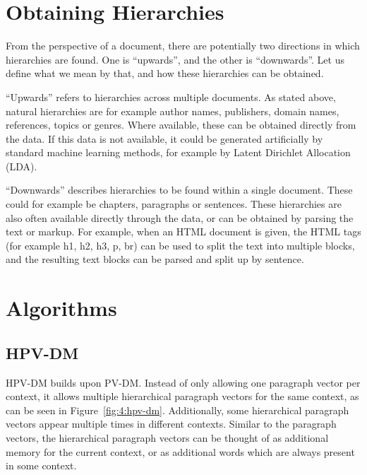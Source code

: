 \section{Obtaining Hierarchies}\label{obtaining-hierarchies}

From the perspective of a document, there are potentially two directions in which hierarchies are found. One is ``upwards'', and the other is ``downwards''. Let us define what we mean by that, and how these hierarchies can be obtained.

``Upwards'' refers to hierarchies across multiple documents. As stated above, natural hierarchies are for example author names, publishers, domain names, references, topics or genres. Where available, these can be obtained directly from the data. If this data is not available, it could be generated artificially by standard machine learning methods, for example by Latent Dirichlet Allocation (LDA).

``Downwards'' describes hierarchies to be found within a single document. These could for example be chapters, paragraphs or sentences. These hierarchies are also often available directly through the data, or can be obtained by parsing the text or markup. For example, when an HTML document is given, the HTML tags (for example h1, h2, h3, p, br) can be used to split the text into multiple blocks, and the resulting text blocks can be parsed and split up by sentence.


\section{Algorithms}\label{algorithms}

\subsection{HPV-DM}\label{hpv-dm}

HPV-DM builds upon PV-DM\@. Instead of only allowing one paragraph vector per context, it allows multiple hierarchical paragraph vectors for the same context, as can be seen in Figure~\ref{fig:4:hpv-dm}. Additionally, some hierarchical paragraph vectors appear multiple times in different contexts. Similar to the paragraph vectors, the hierarchical paragraph vectors can be thought of as additional memory for the current context, or as additional words which are always present in some context.

